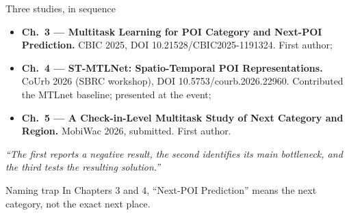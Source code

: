 \documentclass{beamer}
\begin{document}
\begin{frame}{Three studies, in sequence}
    \begin{itemize}\setlength{\itemsep}{5pt}
        \item \textbf{Ch.~3 --- Multitask Learning for POI Category and Next-POI Prediction.}
              CBIC 2025, DOI 10.21528/CBIC2025-1191324. First author;
        \item \textbf{Ch.~4 --- ST-MTLNet: Spatio-Temporal POI Representations.}
              CoUrb 2026 (SBRC workshop), DOI 10.5753/courb.2026.22960. Contributed the MTLnet
              baseline; presented at the event;
        \item \textbf{Ch.~5 --- A Check-in-Level Multitask Study of Next Category and Region.}
              MobiWac 2026, submitted. First author.
    \end{itemize}

    \medskip
    \begin{center}
        \small\itshape ``The first reports a negative result, the second identifies its main
        bottleneck, and the third tests the resulting solution.''
    \end{center}

    \begin{alertblock}{Naming trap}
        \small
        In Chapters 3 and 4, ``Next-POI Prediction'' means the \alert{next category}, not the
        exact next place.
    \end{alertblock}
\end{frame}
\end{document}
